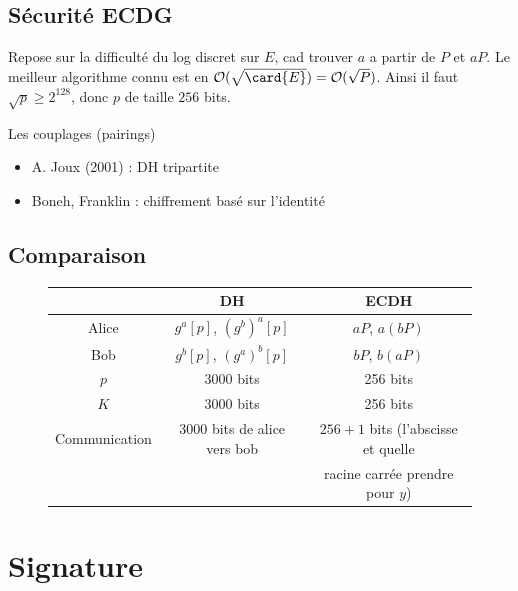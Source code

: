         \subsection{Sécurité ECDG}
            Repose sur la difficulté du log discret sur $E$, cad trouver $a$ a partir de $P$ et $aP$. Le meilleur algorithme connu est en $\mathcal{O}(\sqrt{\card{E}}) = \mathcal{O}(\sqrt{P})$. Ainsi il faut $\sqrt{p} \geq 2^{128}$, donc $p$ de taille $256$ bits.
            \begin{remq}
                Les couplages (pairings)
                \begin{itemize}
                    \item A. Joux (2001) : DH tripartite
                    \item Boneh, Franklin : chiffrement basé sur l'identité 
                \end{itemize}
            \end{remq}

        \subsection{Comparaison}
            \begin{figure}[H]
                \centering
                \begin{tabular}{c|c|c}
                    & DH & ECDH \\
                    \hline
                    Alice & $g^a [p]$, $(g^b)^a[p]$ & $aP$, $a(bP)$ \\
                    \hline
                    Bob & $g^b [p]$, $(g^a)^b[p]$ & $bP$, $b(aP)$ \\
                    \hline
                    $p$ & 3000 bits & 256 bits \\
                    \hline
                    $K$ & 3000 bits & 256 bits \\
                    \hline
                    Communication & 3000 bits de alice vers bob & $256 + 1$ bits (l'abscisse et quelle \\
                    && racine carrée prendre pour $y$) \\
                \end{tabular}
            \end{figure} \noindent

    \section{Signature}
